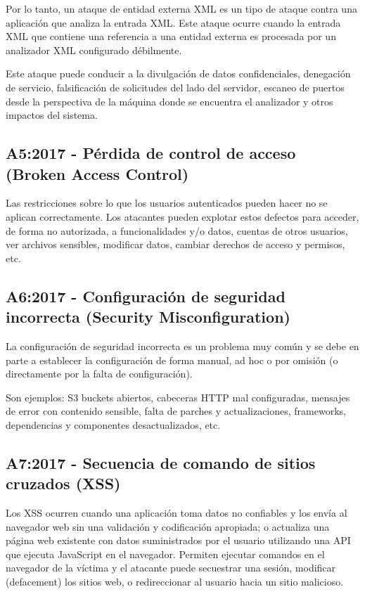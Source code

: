Por lo tanto, un ataque de entidad externa XML es un tipo de ataque contra una aplicación que analiza 
la entrada XML. Este ataque ocurre cuando la entrada XML que contiene una referencia a una 
entidad externa es procesada por un analizador XML configurado débilmente. 

Este ataque puede conducir a la divulgación de datos confidenciales, denegación de servicio, falsificación 
de solicitudes del lado del servidor, escaneo de puertos desde la perspectiva de la máquina donde se 
encuentra el analizador y otros impactos del sistema.

\newpage
\subsection{A5:2017 - Pérdida de control de acceso (Broken Access Control)}

Las restricciones sobre lo que los usuarios autenticados pueden hacer no se aplican
correctamente. Los atacantes pueden explotar estos defectos para acceder, de forma no
autorizada, a funcionalidades y/o datos, cuentas de otros usuarios, ver archivos sensibles,
modificar datos, cambiar derechos de acceso y permisos, etc. 

\subsection{A6:2017 - Configuración de seguridad incorrecta (Security Misconfiguration)}

La configuración de seguridad incorrecta es un problema muy común y se debe en parte a
establecer la configuración de forma manual, ad hoc o por omisión (o directamente por la falta de
configuración). 

Son ejemplos: S3 buckets abiertos, cabeceras HTTP mal configuradas, mensajes
de error con contenido sensible, falta de parches y actualizaciones, frameworks, dependencias y
componentes desactualizados, etc.

\subsection{A7:2017 - Secuencia de comando de sitios cruzados (XSS)}

Los XSS ocurren cuando una aplicación toma datos no confiables y los envía al navegador web
sin una validación y codificación apropiada; o actualiza una página web existente con datos
suministrados por el usuario utilizando una API que ejecuta JavaScript en el navegador. Permiten
ejecutar comandos en el navegador de la víctima y el atacante puede secuestrar una sesión,
modificar (defacement) los sitios web, o redireccionar al usuario hacia un sitio malicioso.

